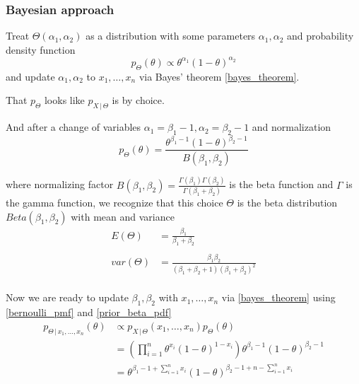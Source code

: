 \documentclass[14pt, reqno]{amsart}
\theoremstyle{definition}
\begin{document}
\subsubsection{Bayesian approach} Treat $\Theta(\alpha_1, \alpha_2)$ as a distribution with some parameters $\alpha_1, \alpha_2$ and probability density function
\vspace{10pt}
$$p_{\Theta}(\theta) \propto \theta^{\alpha_1}(1 - \theta)^{\alpha_2}$$
\vspace{10pt}
\noindent
and update $\alpha_1, \alpha_2$ to $x_1, \dots, x_n$ via Bayes' theorem \ref{bayes_theorem}.
\vspace{20pt}

That $p_{\Theta}$ looks like $p_{X \,|\, \Theta}$ is by choice.
\vspace{20pt}

And after a change of variables $\alpha_1 = \beta_1 - 1, \alpha_2 = \beta_2 - 1$ and normalization
\vspace{10pt}
\begin{equation}\label{prior_beta_pdf}
p_{\Theta}(\theta) = \frac{\theta^{\beta_1 - 1} (1 - \theta)^{\beta_2 - 1}}{B(\beta_1, \beta_2)}
\end{equation}
\vspace{10pt}

\noindent
where normalizing factor $B(\beta_1, \beta_2) = \frac{\Gamma(\beta_1) \Gamma(\beta_2)}{\Gamma(\beta_1 + \beta_2)}$ is the beta function and $\Gamma$ is the gamma function, we recognize that this choice $\Theta$ is the beta distribution $Beta(\beta_1, \beta_2)$ with mean and variance
\vspace{10pt}
\begin{align*}
E(\Theta) & = \frac{\beta_1}{\beta_1 + \beta_2} \\
\\
var(\Theta) & = \frac{\beta_1 \beta_2}{(\beta_1 + \beta_2 + 1)(\beta_1 + \beta_2)^2} \\
\end{align*}
\vfill
\pagebreak

Now we are ready to update $\beta_1, \beta_2$ with $x_1, \dots, x_n$ via \eqref{bayes_theorem} using \eqref{bernoulli_pmf} and \eqref{prior_beta_pdf}
\vspace{10pt}
\begin{align*}
p_{\Theta \,|\, x_1, \dots, x_n}(\theta) & \propto p_{X \,|\, \Theta}(x_1, \dots, x_n) p_{\Theta}(\theta)  \\
 & = \left( \prod \limits _{i=1}^n \theta^{x_i} (1 - \theta)^{1 - x_i} \right) \theta^{\beta_1 - 1} (1 - \theta)^{\beta_2 - 1} \\
 & = \theta^{\beta_1 - 1 + \sum \limits _{i=1}^n x_i} (1 - \theta)^{\beta_2 - 1 + n - \sum \limits _{i=1}^n x_i} \\
\end{align*}
\vspace{20pt}
\end{document}
